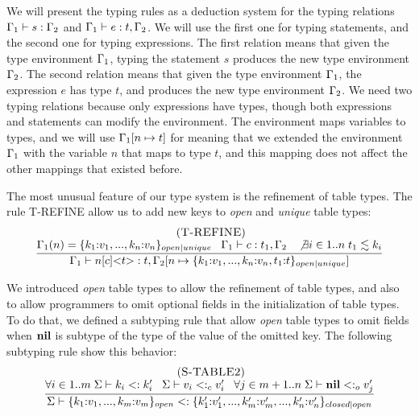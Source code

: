 We will present the typing rules as a deduction system for the typing
relations $\Gamma_{1} \vdash s : \Gamma_{2}$ and $\Gamma_{1} \vdash e : t, \Gamma_{2}$. 
We will use the first one for typing statements, and the second one
for typing expressions.
The first relation means that given the type environment $\Gamma_{1}$,
typing the statement $s$ produces the new type environment $\Gamma_{2}$. 
The second relation means that given the type environment $\Gamma_{1}$,
the expression $e$ has type $t$, and produces the new type environment $\Gamma_{2}$.
We need two typing relations because only expressions have types,
though both expressions and statements can modify the environment.
The environment maps variables to types, and we will use $\Gamma_{1}[n \mapsto t]$
for meaning that we extended the environment $\Gamma_{1}$ with the
variable $n$ that maps to type $t$, and this mapping does not affect
the other mappings that existed before.

The most unusual feature of our type system is the refinement of
table types.
The rule \textsc{T-REFINE} allow us to add new keys to \emph{open}
and \emph{unique} table types:
\[
\begin{array}{c}
\; (\textsc{T-REFINE})\\
\dfrac{\Gamma_{1}(n) = \{ k_{1}{:}v_{1}, ..., k_{n}{:}v_{n} \}_{open|unique} \;\;\;
       \Gamma_{1} \vdash c:t_{1}, \Gamma_{2} \;\;\;
       \not \exists i \in 1..n \; t_{1} \lesssim k_{i}}
      {\Gamma_{1} \vdash n[c] {<}t{>}:t, \Gamma_{2}[n \mapsto \{ k_{1}{:}v_{1}, ..., k_{n}{:}v_{n}, t_{1}{:}t\}_{open|unique}]}
\end{array}
\]

We introduced \emph{open} table types to allow the refinement
of table types, and also to allow programmers to omit optional
fields in the initialization of table types.
To do that, we defined a subtyping rule that allow \emph{open}
table types to omit fields when $\mathbf{nil}$ is subtype of the type of
the value of the omitted key.
The following subtyping rule show this behavior:
\[
\begin{array}{c}
\; (\textsc{S-TABLE2})\\
\dfrac{\forall i \in 1..m \; \Sigma \vdash k_{i} <: k_{i}' \;\;\;
       \Sigma \vdash v_{i} <:_{c} v_{i}' \;\;\;
       \forall j \in m+1..n \; \Sigma \vdash \mathbf{nil} <:_{o} v_{j}'}
      {\Sigma \vdash \{k_{1}{:}v_{1}, ..., k_{m}{:}v_{m}\}_{open} <:
                    \{k_{1}'{:}v_{1}', ..., k_{m}'{:}v_{m}', ..., k_{n}'{:}v_{n}'\}_{closed|open}}
\end{array}
\]

